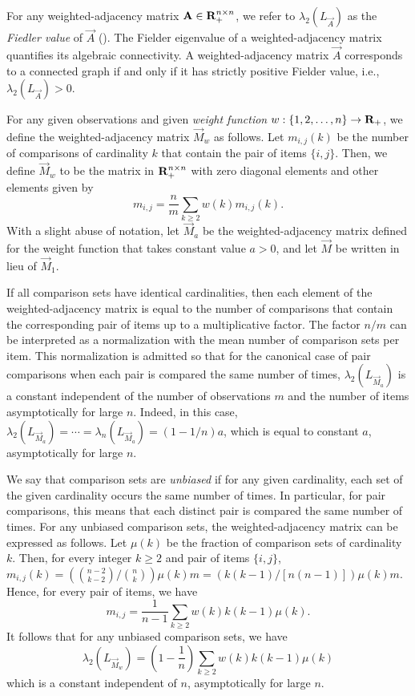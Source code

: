For any weighted-adjacency matrix $\mathbf{A}\in \mathbf{R}^{n\times n}_+$, we refer to $\lambda_2(L_{\vec{A}})$ as the \emph{Fiedler value} of $\vec{A}$ (\cite{F73,F89}). The Fielder eigenvalue of a weighted-adjacency matrix quantifies its algebraic connectivity. A weighted-adjacency matrix $\vec{A}$ corresponds to a connected graph if and only if it has strictly positive Fielder value, i.e., $\lambda_2(L_{\vec{A}}) > 0$.

For any given observations and given \emph{weight function} $w:\{1,2,\ldots,n\}\rightarrow \mathbf{R}_+$, we define the weighted-adjacency matrix $\vec{M}_w$ as follows. Let $m_{i,j}(k)$ be the number of comparisons of cardinality $k$ that contain the pair of items $\{i,j\}$. Then, we define $\vec{M}_w$ to be the matrix in $\mathbf{R}_+^{n\times n}$ with zero diagonal elements and other elements given by 
\begin{equation}
m_{i,j} = \frac{n}{m}\sum_{k\geq 2} w(k) m_{i,j}(k).
\label{equ:weightmatrix}
\end{equation}
With a slight abuse of notation, let $\vec{M}_a$ be the weighted-adjacency matrix defined for the weight function that takes constant value $a > 0$, and let $\vec{M}$ be written in lieu of $\vec{M}_1$. 

If all comparison sets have identical cardinalities, then each element of the weighted-adjacency matrix is equal to the number of comparisons that contain the corresponding pair of items up to a multiplicative factor. The factor $n/m$ can be interpreted as a normalization with the mean number of comparison sets per item. This normalization is admitted so that for the canonical case of pair comparisons when each pair is compared the same number of times, $\lambda_2(L_{\vec{M}_a})$ is a constant independent of the number of observations $m$ and the number of items asymptotically for large $n$. Indeed, in this case, $\lambda_2(L_{\vec{M}_a}) = \cdots = \lambda_n(L_{\vec{M}_a}) = (1-1/n)a$, which is equal to constant $a$, asymptotically for large $n$.

We say that comparison sets are \emph{unbiased} if for any given cardinality, each set of the given cardinality occurs the same number of times. In particular, for pair comparisons, this means that each distinct pair is compared the same number of times. For any unbiased comparison sets, the weighted-adjacency matrix can be expressed as follows. Let $\mu(k)$ be the fraction of comparison sets of cardinality $k$. Then, for every integer $k\geq 2$ and pair of items $\{i,j\}$, $m_{i,j}(k) = \left(\binom{n-2}{k-2}/\binom{n}{k}\right) \mu(k) m = \left(k(k-1)/[n(n-1)]\right) \mu(k) m$. Hence, for every pair of items, we have
\begin{equation}
m_{i,j} = \frac{1}{n-1}\sum_{k\geq 2} w(k) k(k-1)\mu(k).
\label{equ:unbiased}
\end{equation}
It follows that for any unbiased comparison sets, we have
\begin{equation}
\lambda_2(L_{\vec{M}_w}) = \left(1-\frac{1}{n}\right)\sum_{k\geq 2} w(k) k(k-1)\mu(k)
\label{equ:lambda2L}
\end{equation}
which is a constant independent of $n$, asymptotically for large $n$. 

